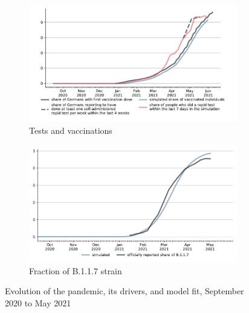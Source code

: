 \begin{figure}[!tp]
\begin{subfigure}[b]{0.475\textwidth}
        \includegraphics[width=\textwidth]{../figures/results/figures/scenario_comparisons/combined_fit/full_share_rapid_test_in_last_week_and_vaccinated}

        \caption{{Tests and vaccinations}}
        \label{fig:antigen_tests_vaccinations}
    \end{subfigure}
    \hfill
    \begin{subfigure}[b]{0.475\textwidth}
        \centering

        \includegraphics[width=\textwidth]{../figures/results/figures/scenario_comparisons/combined_fit/full_share_b117}

        \caption{Fraction of B.1.1.7 strain}
        \label{fig:share_b117}
    \end{subfigure}

    \caption{Evolution of the pandemic, its drivers, and model fit, September 2020 to May 2021}
    \label{fig:pandemic_drivers_model_fit}


\end{figure}


